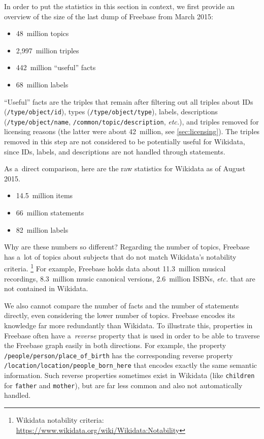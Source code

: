 \documentclass{sig-alternate-2013}
\begin{document}
In order to put the statistics in this section in context,
we first provide an overview of the size of the last dump of Freebase
from March 2015:

\begin{itemize}
  \setlength\itemsep{0em}
  \item 48~million topics
  \item 2,997~million triples
  \item 442~million ``useful'' facts%
  \item 68~million labels
\end{itemize}

``Useful'' facts are the triples that remain
after filtering out all triples about IDs (\texttt{/type/object/id}),
types \linebreak (\texttt{/type/object/type}), labels, descriptions \linebreak
(\texttt{/type/object/name},
\texttt{/common/topic/description}, \emph{etc.}), \linebreak and triples removed
for licensing reasons (the latter were about 42~million, see \autoref{sec:licensing}).
The triples removed in this step are not considered to be potentially useful for
Wikidata, since IDs, labels, and descriptions are not handled through statements.

As a~direct comparison, here are the raw statistics for Wikidata as of August 2015.

\begin{itemize}
    \setlength\itemsep{0em}
    \item 14.5~million items
    \item 66~million statements
    \item 82~million labels
\end{itemize}

Why are these numbers so different?
Regarding the number of topics, Freebase has a~lot of topics about subjects
that do not match Wikidata's notability criteria.%
\footnote{Wikidata notability criteria:
\url{https://www.wikidata.org/wiki/Wikidata:Notability}}
For example, Freebase holds data about 11.3~million musical recordings,
8.3~million music canonical versions, 2.6~million ISBNs, \emph{etc.} that are not contained in Wikidata.

We also cannot compare the number of facts and the number of statements directly,
even considering the lower number of topics.
Freebase encodes its knowledge far more redundantly than Wikidata.
To illustrate this, properties in Freebase often have a~\emph{reverse} property
that is used in order to be able to traverse the Freebase graph easily in both directions.
For example, the property \texttt{/people/person/place\_of\_birth} has the corresponding
reverse property \linebreak \texttt{/location/location/people\_born\_here}
that encodes exactly the same semantic information.
Such reverse properties sometimes exist in Wikidata
(like \texttt{children} for \texttt{father} and \texttt{mother}),
but are far less common and also not automatically handled.
\end{document}

